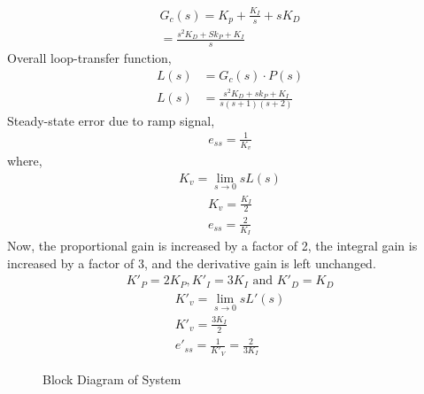 \documentclass[journal,12pt,twocolumn]{IEEEtran}
\theoremstyle{remark}
\begin{document}
\begin{align}
    G_c(s) = K_p + \frac{K_I}{s} +sK_D\\
    =\frac{s^2K_D + Sk_P + K_I}{s}
\end{align}
Overall loop-transfer function,
\begin{align}
    L(s) &= G_c(s)\cdot P(s)\\
    L(s) &= \frac{s^2K_D + sk_P + K_I}{s(s+1)(s+2)}
\end{align}
Steady-state error due to ramp signal,
\begin{align}
    e_{ss} = \frac{1}{K_v}
\end{align}
where,
\begin{align}
    K_v = \lim_{s \to 0} sL(s)
\end{align}
\begin{align}
    K_v = \frac{K_I}{2}\\
    e_{ss} = \frac{2}{K_I}
\end{align}
Now, the proportional gain is increased by a factor of 2, the integral gain is increased by a factor of 3, and the derivative gain is left unchanged.
\begin{align}
    K'_P = 2K_P, K'_I = 3K_I \text{ and } K'_D = K_D
\end{align}
\begin{align}
    K'_v = \lim_{s \to 0} sL'(s)\\
    K'_v = \frac{3K_I}{2}\\
    e'_{ss} = \frac{1}{K'_V} = \frac{2}{3K_I}
\end{align}
\begin{figure}[!ht]
    \resizebox{0.55\textwidth}{!}{}
    \caption{Block Diagram of System}
    \label{fig:gate_IN_Q41_blockdiagram}
\end{figure}


% 
\end{document}
